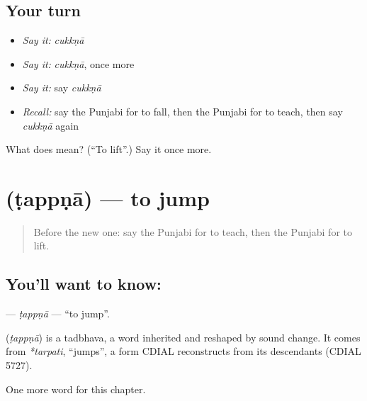 \subsection*{Your turn}
\begin{itemize}
\raggedright
  \item \emph{Say it:} \emph{cukkṇā}
  \item \emph{Say it:} \emph{cukkṇā}, once more
  \item \emph{Say it:} say \emph{cukkṇā}
  \item \emph{Recall:} say the Punjabi for to fall, then the Punjabi for to teach, then say \emph{cukkṇā} again
\end{itemize}

\begin{tcolorbox}[breakable,colback=teal!4,colframe=teal!35!black,title={Before you move on}]
What does  mean? (\textquotedblleft{}To lift\textquotedblright{}.) Say it once more.
\end{tcolorbox}
\section[\texorpdfstring{\pa{ਟੱਪਣਾ} (ṭappṇā)}{ਟੱਪਣਾ (ṭappṇā)}]{ (ṭappṇā) — to jump}

\label{lesson:PA-C148-tappna}



\begin{quote}
Before the new one: say the Punjabi for to teach, then the Punjabi for to lift.
\end{quote}

\subsection*{You'll want to know: }
\textbf{} — \emph{ṭappṇā} — \textquotedblleft{}to jump\textquotedblright{}.

\begin{cousinweb}
\textbf{} (\emph{ṭappṇā}) is a tadbhava, a word inherited and reshaped by sound change. It comes from \emph{*tarpati}, \textquotedblleft{}jumps\textquotedblright{}, a form CDIAL reconstructs from its descendants (CDIAL 5727).
\end{cousinweb}

\begin{grammarlens}[title={What you've built}]
One more word for this chapter.
\end{grammarlens}

